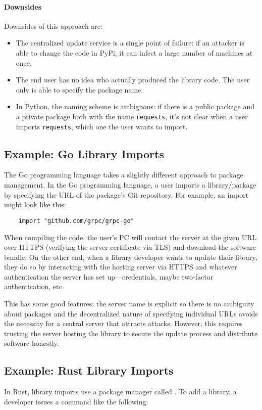 \paragraph{Downsides} Downsides of this approach are:
\begin{itemize}
  \item The centralized update service is a single point of 
        failure: if an attacker is able to change the code in
        PyPi, it can infect a large number of machines at once.
  \item The end user has no idea who actually produced the library
        code. The user only is able to specify the package name.
  \item In Python, the naming scheme is ambiguous: if there is
        a public package and a private package both with the name
        \texttt{requests}, it's not clear when a user imports
        \texttt{requests}, which one the user wants to import.
\end{itemize}


\subsection{Example: Go Library Imports}
The Go programming language takes a slightly different
approach to package management.
In the Go programming language, a user
imports a library/package by 
specifying the URL of the package's 
Git repository.
For example, an import might look like this:
\begin{lstlisting}	
	import "github.com/grpc/grpc-go"
\end{lstlisting}

When compiling the code, the user's PC will contact the server at the given URL over HTTPS (verifying the server certificate via TLS) and download the software bundle. On the other end, when a library developer wants to update their library, they do so by interacting with the hosting server via HTTPS and whatever authentication the server has set up---credentials, maybe two-factor authentication, etc.

This has some good features: the server name is explicit so there is no ambiguity about packages and the decentralized nature of specifying individual URLs avoids the necessity for a central server that attracts attacks. However, this requires trusting the server hosting the library to secure the update process and distribute software honestly.

\iffalse
\subsection{Example: Rust Library Imports}
In Rust, library imports use a package manager called . To add a library, a developer issues a command like the following:

